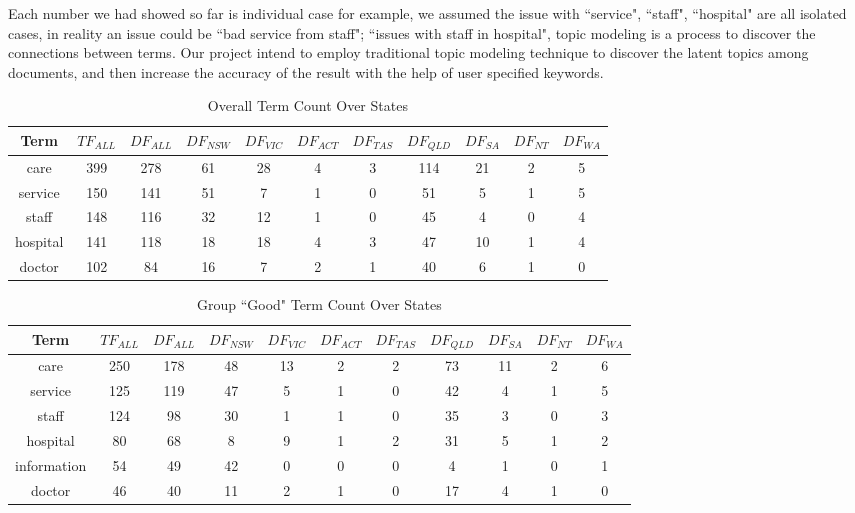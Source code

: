 \documentclass[11pt,twoside]{report}
\begin{document}
Each number we had showed so far is individual case for example, we assumed the issue with ``service", ``staff", ``hospital" are all isolated cases, in reality an issue could be ``bad service from staff"; ``issues with staff in hospital", topic modeling is a process to discover the connections between terms. Our project intend to employ traditional topic modeling technique to discover the latent topics among documents, and then increase the accuracy of the result with the help of user specified keywords.


\begin{table}[h]
\tiny
\caption{Overall Term Count Over States}
\centering
\begin{tabular}{| c | c | c | c | c | c | c | c |c | c | c |}
\hline\hline
Term & $TF_{ALL}$ & $DF_{ALL}$ & $DF_{NSW}$ & $DF_{VIC}$ & $DF_{ACT}$ & $DF_{TAS}$ & $DF_{QLD}$ & $DF_{SA}$ & $DF_{NT}$ & $DF_{WA}$ \\
\hline
care & 399 & 278 & 61 & 28 & 4 & 3 & 114 & 21 & 2 & 5 \\
\hline
service & 150 & 141 & 51 & 7 & 1 & 0 & 51 & 5 & 1 & 5 \\
\hline
staff & 148 & 116 & 32 & 12 & 1 & 0 & 45 & 4 & 0 & 4 \\
\hline
hospital & 141 & 118 & 18 & 18 & 4 & 3 & 47 & 10 & 1 & 4 \\
\hline
doctor & 102 & 84 & 16 & 7 & 2 & 1 & 40 & 6 & 1 & 0 \\
\hline
\end{tabular}
\label{table:OverAllCount}
\end{table}

\begin{table}[h]
\tiny
\caption{Group ``Good" Term Count Over States}
\centering
\begin{tabular}{| c | c | c | c | c | c | c | c |c | c | c |}
\hline\hline
Term & $TF_{ALL}$ & $DF_{ALL}$ & $DF_{NSW}$ & $DF_{VIC}$ & $DF_{ACT}$ & $DF_{TAS}$ & $DF_{QLD}$ & $DF_{SA}$ & $DF_{NT}$ & $DF_{WA}$ \\
\hline
care & 250 & 178 & 48 & 13 & 2 & 2 & 73 & 11 & 2 & 6 \\
\hline
service & 125 & 119 & 47 & 5 & 1 & 0 & 42 & 4 & 1 & 5 \\
\hline
staff & 124 & 98 & 30 & 1 & 1 & 0 & 35 & 3 & 0 & 3 \\
\hline
hospital & 80 & 68 & 8 & 9 & 1 & 2 & 31 & 5 & 1 & 2 \\
\hline
information & 54 & 49 & 42 & 0 & 0 & 0 & 4 & 1 & 0 & 1 \\
\hline
doctor & 46 & 40 & 11 & 2 & 1 & 0 & 17 & 4 & 1 & 0 \\
\hline
\end{tabular}
\label{table:GoodCount}
\end{table}
\end{document}

